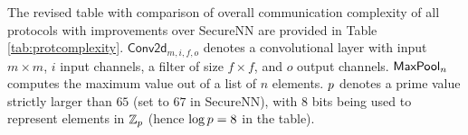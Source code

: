 The revised table with comparison of overall communication complexity of all protocols with improvements over SecureNN are provided in Table \ref{tab:protcomplexity}. 
$\mathsf{Conv2d}_{m,i,f,o}$ denotes a convolutional layer with input $m\times m$, $i$ input channels, a filter of size $f\times f$, and $o$ output channels. 
$\mathsf{MaxPool}_n$ computes the maximum value out of a list of $n$ elements. $p$ denotes a prime value strictly larger than $65$ (set to $67$ in SecureNN), with $8$ bits being used to represent elements in $\mathbb{Z}_p$ (hence $\log \prm = 8$ in the table). %

\begin{table}
  \centering
 \caption{Communication complexity of protocols; $q = m-f+1$ and $\log \prm = 8$.}
\label{tab:protcomplexity}
\end{table}

 


